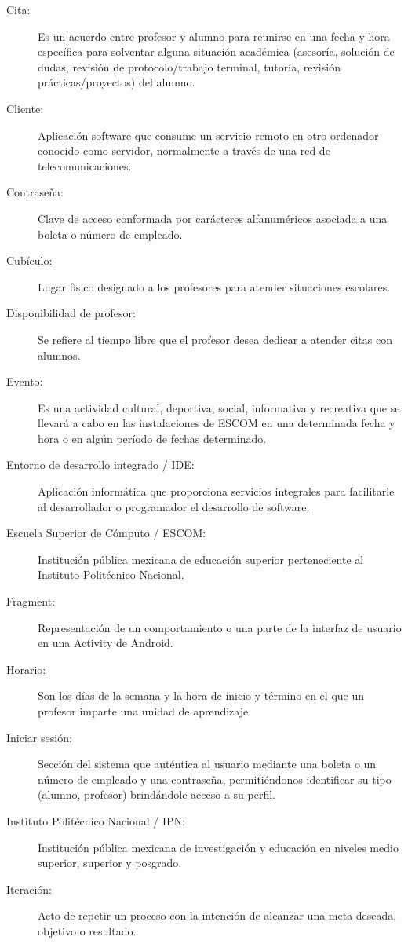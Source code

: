 \begin{description}
	\item[Cita:] Es un acuerdo entre profesor y alumno para reunirse en una fecha y hora específica para solventar alguna situación académica (asesoría, solución de dudas, revisión de protocolo/trabajo terminal, tutoría, revisión prácticas/proyectos) del alumno.
	\item[Cliente:] Aplicación software que consume un servicio remoto en otro ordenador conocido como servidor, normalmente a través de una red de telecomunicaciones.
	\item[Contraseña:] Clave de acceso conformada por carácteres alfanuméricos asociada a una boleta o número de empleado.
	\item[Cubículo:] Lugar físico designado a los profesores para atender situaciones escolares.

	\item[Disponibilidad de profesor:] Se refiere al tiempo libre que el profesor desea dedicar a atender citas con alumnos.
	
	\item[Evento:] Es una actividad cultural, deportiva, social, informativa y recreativa que se llevará a cabo en las instalaciones de ESCOM en una determinada fecha y hora o en algún período de fechas determinado.
	\item[Entorno de desarrollo integrado / IDE:] Aplicación informática que proporciona servicios integrales para facilitarle al desarrollador o programador el desarrollo de software.
	\item[Escuela Superior de Cómputo / ESCOM:] Institución pública mexicana de educación superior perteneciente al Instituto Politécnico Nacional.

	\item[Fragment:] Representación de un comportamiento o una parte de la interfaz de usuario en una Activity de Android.
	
	\item[Horario:] Son los días de la semana y la hora de inicio y término en el que un profesor imparte una unidad de aprendizaje.
	
	\item[Iniciar sesión:] Sección del sistema que auténtica al usuario mediante una boleta o un número de empleado y una contraseña, permitiéndonos identificar su tipo (alumno, profesor) brindándole acceso a su perfil.
	\item[Instituto Politécnico Nacional / IPN:] Institución pública mexicana de investigación y educación en niveles medio superior, superior y posgrado.
	\item[Iteración:] Acto de repetir un proceso con la intención de alcanzar una meta deseada, objetivo o resultado.
	

\end{description}
